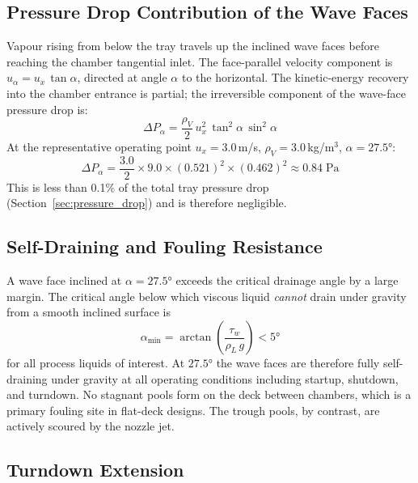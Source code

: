 \documentclass[11pt,letterpaper]{article}
\newcommand{\rhoL}{\rho_L}
\newcommand{\rhoV}{\rho_V}
\newcommand{\ux}{u_{x}}
\begin{document}
\subsection{Pressure Drop Contribution of the Wave Faces}
\label{sec:wavy_dp}

Vapour rising from below the tray travels up the inclined wave faces
before reaching the chamber tangential inlet.  The face-parallel
velocity component is $u_\alpha = \ux\,\tan\alpha$, directed at angle
$\alpha$ to the horizontal.  The kinetic-energy recovery into the
chamber entrance is partial; the irreversible component of the
wave-face pressure drop is:
\begin{equation}
  \Delta P_\alpha = \frac{\rhoV}{2}\,\ux^2\,\tan^2\!\alpha\,\sin^2\!\alpha
  \label{eq:dp_wave}
\end{equation}
At the representative operating point $\ux = 3.0$\,m/s,
$\rhoV = 3.0$\,kg/m$^3$, $\alpha = 27.5°$:
\[
  \Delta P_\alpha = \frac{3.0}{2}\times9.0\times(0.521)^2\times(0.462)^2
  \approx 0.84\;\text{Pa}
\]
This is less than 0.1\% of the total tray pressure drop
(Section~\ref{sec:pressure_drop}) and is therefore negligible.

\subsection{Self-Draining and Fouling Resistance}
\label{sec:wavy_drain}

A wave face inclined at $\alpha = 27.5°$ exceeds the critical drainage
angle by a large margin.  The critical angle below which viscous liquid
\emph{cannot} drain under gravity from a smooth inclined surface is
\[
  \alpha_{\min} = \arctan\!\left(\frac{\tau_w}{\rhoL\,g}\right) < 5°
\]
for all process liquids of interest.  At $27.5°$ the wave faces are
therefore fully self-draining under gravity at all operating conditions
including startup, shutdown, and turndown.  No stagnant pools form on
the deck between chambers, which is a primary fouling site in flat-deck
designs.  The trough pools, by contrast, are actively scoured by the
nozzle jet.

\subsection{Turndown Extension}
\label{sec:wavy_turndown}
\end{document}
